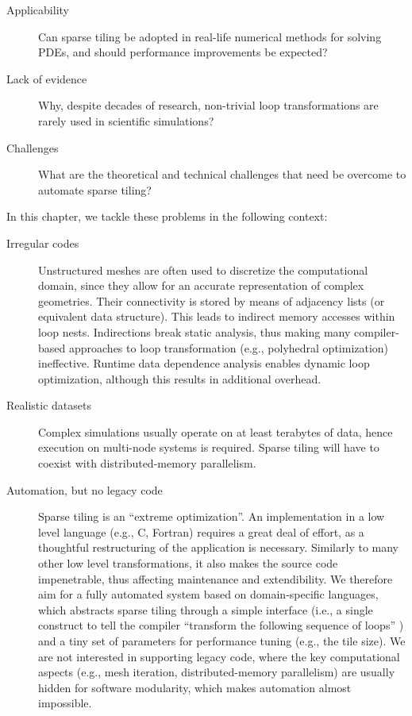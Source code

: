 \begin{description}
\item[Applicability] Can sparse tiling be adopted in real-life numerical methods for solving PDEs, and should performance improvements be expected?
\item[Lack of evidence] Why, despite decades of research, non-trivial loop transformations are rarely used in scientific simulations? 
\item[Challenges] What are the theoretical and technical challenges that need be overcome to automate sparse tiling?
\end{description}

In this chapter, we tackle these problems in the following context:
\begin{description}
\item[Irregular codes] Unstructured meshes are often used to discretize the computational domain, since they allow for an accurate representation of complex geometries. Their connectivity is stored by means of adjacency lists (or equivalent data structure). This leads to indirect memory accesses within loop nests. Indirections break static analysis, thus making many compiler-based approaches to loop transformation (e.g., polyhedral optimization) ineffective. Runtime data dependence analysis enables dynamic loop optimization, although this results in additional overhead.
\item[Realistic datasets] Complex simulations usually operate on at least terabytes of data, hence execution on multi-node systems is required. Sparse tiling will have to coexist with distributed-memory parallelism.
\item[Automation, but no legacy code] Sparse tiling is an ``extreme optimization''. An implementation in a low level language (e.g., C, Fortran) requires a great deal of effort, as a thoughtful restructuring of the application is necessary. Similarly to many other low level transformations, it also makes the source code impenetrable, thus affecting maintenance and extendibility. We therefore aim for a fully automated system based on domain-specific languages, which abstracts sparse tiling through a simple interface (i.e., a single construct to tell the compiler ``transform the following sequence of loops'' ) and a tiny set of parameters for performance tuning (e.g., the tile size). We are not interested in supporting legacy code, where the key computational aspects (e.g., mesh iteration, distributed-memory parallelism) are usually hidden for software modularity, which makes automation almost impossible.
\end{description}

